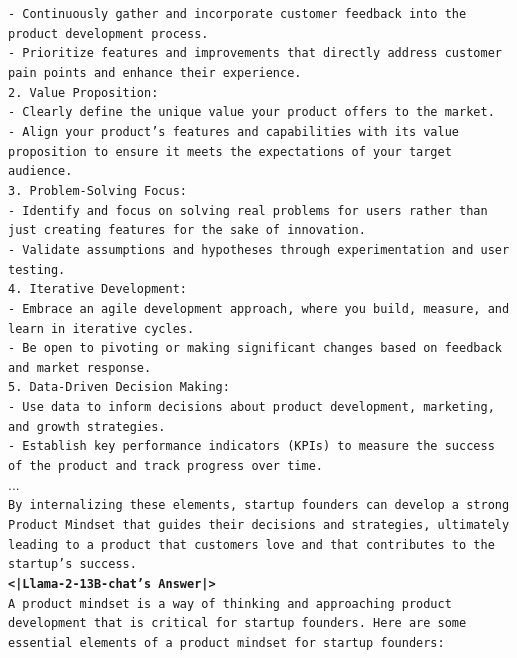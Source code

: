 \documentclass{article}
\begin{document}
\begin{tcolorbox}
\texttt{- Continuously gather and incorporate customer feedback into the product development process. \\
   - Prioritize features and improvements that directly address customer pain points and enhance their experience.} \\

\texttt{2. Value Proposition: \\
   - Clearly define the unique value your product offers to the market. \\
   - Align your product's features and capabilities with its value proposition to ensure it meets the expectations of your target audience.} \\

\texttt{3. Problem-Solving Focus: \\
   - Identify and focus on solving real problems for users rather than just creating features for the sake of innovation. \\
   - Validate assumptions and hypotheses through experimentation and user testing.} \\

\texttt{4. Iterative Development: \\
   - Embrace an agile development approach, where you build, measure, and learn in iterative cycles. \\
   - Be open to pivoting or making significant changes based on feedback and market response.} \\

\texttt{5. Data-Driven Decision Making: \\
   - Use data to inform decisions about product development, marketing, and growth strategies. \\
   - Establish key performance indicators (KPIs) to measure the success of the product and track progress over time.} \\

... \\

\texttt{By internalizing these elements, startup founders can develop a strong Product Mindset that guides their decisions and strategies, ultimately leading to a product that customers love and that contributes to the startup's success.} \\

\texttt{\textbf{<|Llama-2-13B-chat's Answer|>} \\
A product mindset is a way of thinking and approaching product development that is critical for startup founders. Here are some essential elements of a product mindset for startup founders:} \\


\end{tcolorbox}
\end{document}
